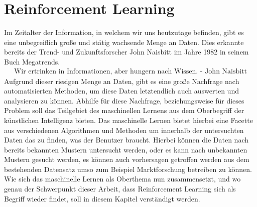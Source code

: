 \documentclass[]{iat}
\begin{document}
\chapter{Reinforcement Learning}
Im Zeitalter der Information, in welchem wir uns heutzutage befinden, gibt es eine unbegreiflich große und stätig wachsende Menge an Daten. Dies erkannte bereits der Trend- und Zukunftsforscher John Naisbitt im Jahre 1982 in seinem Buch Megatrends.
\begin{align*}
    \text{Wir ertrinken in Informationen, aber hungern nach Wissen. - John Naisbitt}
\end{align*}
Aufgrund dieser riesigen Menge an Daten, gibt es eine große Nachfrage nach automatisierten Methoden, um diese Daten letztendlich auch auswerten und analysieren zu können. Abhilfe für diese Nachfrage, beziehungsweise für dieses Problem soll das Teilgebiet des maschinellen Lernens aus dem Oberbegriff der künstlichen Intelligenz bieten. Das maschinelle Lernen bietet hierbei eine Facette aus verschiedenen Algorithmen und Methoden um innerhalb der untersuchten Daten das zu finden, was der Benutzer braucht. Hierbei können die Daten nach bereits bekannten Mustern untersucht werden, oder es kann nach unbekannten Mustern gesucht werden, es können auch vorhersagen getroffen werden aus dem bestehenden Datensatz umso zum Beispiel Marktforschung betreiben zu können. Wie sich das maschinelle Lernen als Oberthema nun zusammensetzt, und wo genau der Schwerpunkt dieser Arbeit, dass Reinforcement Learning sich als Begriff wieder findet, soll in diesem Kapitel verständigt werden.
\end{document}
